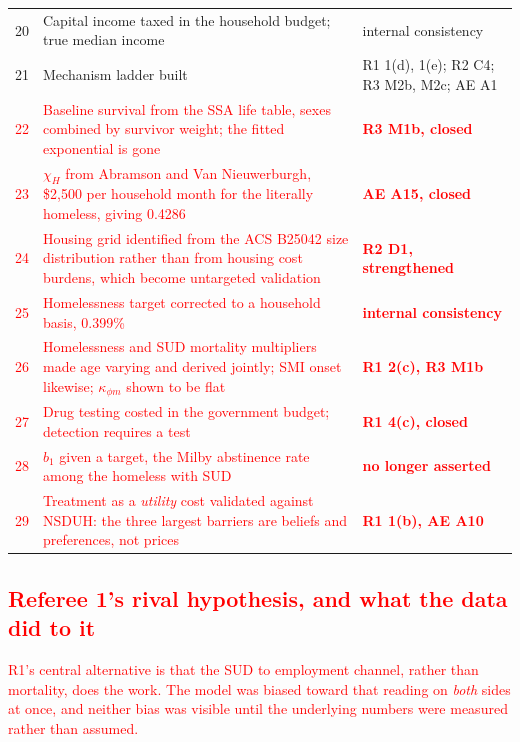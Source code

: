 \documentclass[11pt]{article}
\newcommand{\nw}[1]{\textcolor{red}{#1}}
\begin{document}
\begin{longtable}{rL{6.2cm}L{6.4cm}}
20 & Capital income taxed in the household budget; true median income & internal consistency\\
21 & Mechanism ladder built & R1 1(d), 1(e); R2 C4; R3 M2b, M2c; AE A1\\
\nw{22} & \nw{Baseline survival from the SSA life table, sexes combined by survivor weight; the fitted exponential is gone} & \nw{\textbf{R3 M1b, closed}}\\
\nw{23} & \nw{$\chi_H$ from Abramson and Van Nieuwerburgh, \$2{,}500 per household month for the literally homeless, giving 0.4286} & \nw{\textbf{AE A15, closed}}\\
\nw{24} & \nw{Housing grid identified from the ACS B25042 size distribution rather than from housing cost burdens, which become untargeted validation} & \nw{\textbf{R2 D1, strengthened}}\\
\nw{25} & \nw{Homelessness target corrected to a household basis, 0.399\%} & \nw{\textbf{internal consistency}}\\
\nw{26} & \nw{Homelessness and SUD mortality multipliers made age varying and derived jointly; SMI onset likewise; $\kappa_{\phi m}$ shown to be flat} & \nw{\textbf{R1 2(c), R3 M1b}}\\
\nw{27} & \nw{Drug testing costed in the government budget; detection requires a test} & \nw{\textbf{R1 4(c), closed}}\\
\nw{28} & \nw{$b_1$ given a target, the Milby abstinence rate among the homeless with SUD} & \nw{\textbf{no longer asserted}}\\
\nw{29} & \nw{Treatment as a \emph{utility} cost validated against NSDUH: the three largest barriers are beliefs and preferences, not prices} & \nw{\textbf{R1 1(b), AE A10}}\\
\bottomrule
\end{longtable}

\subsection{\nw{Referee 1's rival hypothesis, and what the data did to it}}

\nw{R1's central alternative is that the SUD to employment channel, rather than
mortality, does the work. The model was biased toward that reading on
\emph{both} sides at once, and neither bias was visible until the underlying
numbers were measured rather than assumed.}
\end{document}
